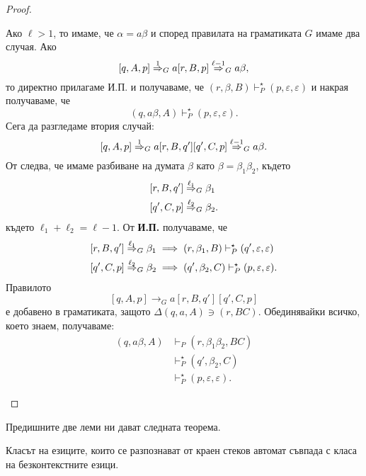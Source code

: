 \begin{proof}
\begin{description}
    Ако $\ell > 1$, то имаме, че $\alpha = a\beta$ и според правилата на граматиката $G$ имаме два случая.
    Ако
    \[[q,A,p] \stackrel{{1}}{\Rightarrow}_G a[r,B,p] \stackrel{{\ell-1}}{\Rightarrow}_G a\beta,\]
    то директно прилагаме И.П. и получаваме, че
    $(r, \beta, B) \vdash^\star_P (p, \varepsilon, \varepsilon)$ и накрая получаваме, че
    \[(q, a\beta, A) \vdash^\star_P (p, \varepsilon, \varepsilon).\]
    Сега да разгледаме втория случай:
    \[[q,A,p] \stackrel{{1}}{\Rightarrow}_G a[r,B,q'][q',C,p] \stackrel{{\ell-1}}{\Rightarrow}_G a\beta.\]
    От  следва, че имаме разбиване на думата $\beta$ като $\beta = \beta_1\beta_2$, където 
    \begin{align*}
      & [r,B,q'] \stackrel{{\ell_1}}{\Rightarrow}_G \beta_1\\
      & [q',C,p] \stackrel{{\ell_2}}{\Rightarrow}_G \beta_2.
    \end{align*}
    където $\ell_1 + \ell_2 = \ell - 1$.
    От {\bf И.П.} получаваме, че 
    \begin{align*}
      & [r,B,q'] \stackrel{{\ell_1}}{\Rightarrow}_G \beta_1 \implies (r,\beta_1,B) \vdash^\star_P (q',\varepsilon,\varepsilon) \\
      & [q',C,p] \stackrel{{\ell_2}}{\Rightarrow}_G \beta_2 \implies (q',\beta_2,C) \vdash^\star_P (p,\varepsilon,\varepsilon).
    \end{align*}
    Правилото
    \[[q,A,p] \rightarrow_G a[r,B,q'][q',C,p]\]
    е добавено в граматиката, защото $\Delta(q,a,A) \ni (r, BC)$. 
    Обединявайки всичко, което знаем, получаваме:
    \begin{align*}
      (q, a\beta, A) & \vdash_P (r, \beta_1\beta_2, BC)\\
                     & \vdash^\star_P (q', \beta_2, C)\\
                     & \vdash^\star_P (p, \varepsilon, \varepsilon).
    \end{align*}    
  \end{description}
\end{proof}

Предишните две леми ни дават следната теорема.
\begin{important}
  \begin{theorem}
    \label{th:push-down-context-free}
    Класът на езиците, които се разпознават от краен стеков автомат съвпада с
    класа на безконтекстните езици.
  \end{theorem}
\end{important}

